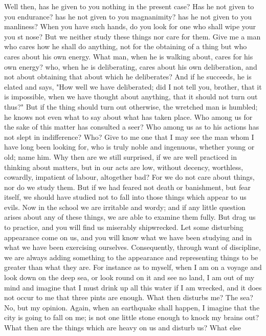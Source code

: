 \documentclass[a4paper]{article}
\begin{document}
Well then, has he given to you nothing in the present case? Has he not given to
you endurance? has he not given to you magnanimity? has he not given to you
manliness? When you have such hands, do you look for one who shall wipe your
you st nose? But we neither study these things nor care for them. Give me a man
who cares how he shall do anything, not for the obtaining of a thing but who
cares about his own energy. What man, when he is walking about, cares for his
own energy? who, when he is deliberating, cares about his own deliberation, and
not about obtaining that about which he deliberates? And if he succeeds, he is
elated and says, "How well we have deliberated; did I not tell you, brother,
that it is impossible, when we have thought about anything, that it should not
turn out thus?" But if the thing should turn out otherwise, the wretched man is
humbled; he knows not even what to say about what has taken place. Who among us
for the sake of this matter has consulted a seer? Who among us as to his
actions has not slept in indifference? Who? Give to me one that I may see the
man whom I have long been looking for, who is truly noble and ingenuous,
whether young or old; name him.
    Why then are we still surprised, if we are well practiced in thinking about
matters, but in our acts are low, without decency, worthless, cowardly,
impatient of labour, altogether bad? For we do not care about things, nor do we
study them. But if we had feared not death or banishment, but fear itself, we
should have studied not to fall into those things which appear to us evils. Now
in the school we are irritable and wordy; and if any little question arises
about any of these things, we are able to examine them fully. But drag us to
practice, and you will find us miserably shipwrecked. Let some disturbing
appearance come on us, and you will know what we have been studying and in what
we have been exercising ourselves. Consequently, through want of discipline, we
are always adding something to the appearance and representing things to be
greater than what they are. For instance as to myself, when I am on a voyage
and look down on the deep sea, or look round on it and see no land, I am out of
my mind and imagine that I must drink up all this water if I am wrecked, and it
does not occur to me that three pints are enough. What then disturbs me? The
sea? No, but my opinion. Again, when an earthquake shall happen, I imagine that
the city is going to fall on me; is not one little stone enough to knock my
brains out?
    What then are the things which are heavy on us and disturb us? What else
\end{document}
